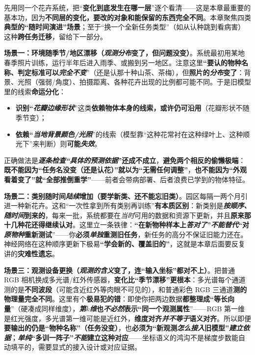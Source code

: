 先用同一个花卉系统，把“\textbf{变化到底发生在哪一层}”逐个看清——这是本章最重要的基本功，因为\textbf{不同层的变化，要改的对象和能保留的东西完全不同}。本章聚焦四类\textbf{典型的“随时间演进”场景}；至于“换一个全新任务类型”（如从认种跳到看病害）这种\textbf{跨任务迁移}，留给下一部分。

\textbf{场景一：环境随季节/地区漂移（\emph{观测分布}变了，但问题没变）}。系统最初用某地春季照片训练，运行半年后进入雨季、或搬到另一地区。注意这里\textbf{“要认的物种名称、判定标准可以\emph{完全不变}}”（还是认那十种山茶、茶梅），但\textbf{照片的\emph{分布}变了}：背景、光照（强弱/角度）、拍摄距离、各种花卉出现的比例都可能不同。于是旧模型里的线索\textbf{命运分化}：
\begin{itemize}\item \textbf{识别“\emph{花瓣边缘形状}}”这类\textbf{依赖物体本身的线索，或许仍可沿用}（花瓣形状不随季节变）；\item \textbf{依赖“\emph{当地背景颜色/光照}}”的线索（模型靠“这种花常衬在这种绿叶上、这种顺光下”来判断）则\textbf{可能\emph{失效}}。\end{itemize}
正确做法是\textbf{\emph{逐条检查“具体的预测依据}”还成不成立}，\textbf{避免两个相反的偷懒极端}：\textbf{既不能因为“任务名没变（还是认花）”就以为“无需任何调整”}，\textbf{也不能因为“外观看着变了”就“全部推倒重学”}——前者会带病部署、后者浪费已学到的物体特征。

\textbf{场景二：类别随时间\emph{陆续}增加（要学新类、还不能忘旧类）}。园区每隔一两个月引进一种新花卉。这和“一次性拿到所有类别再训练”\textbf{有本质区别}：新类别是\textbf{\emph{按顺序、随时间}到来的}，每来一批，系统都要在\emph{当时}可用的数据和资源下更新，并且\textbf{原来那十几种花还得继续认对}。这里立一条铁律：\textbf{“在新物种样本上\emph{答对了}”\emph{不能替代}“对\emph{原物种}重新测试}”——你\textbf{必须\emph{单独}重测旧任务}，新任务的高分不保证旧能力还在。神经网络在这种顺序更新下极易\textbf{“学会新的、覆盖旧的”}，这就是本章后面要反复讲的\textbf{灾难性遗忘}。

\textbf{场景三：观测设备更换（\emph{观测的含义}变了，连“输入坐标”都对不上）}。把普通 RGB 相机换成多光谱/红外传感器，\textbf{变化比“季节漂移”更根本}：多光谱每个通道测的是\textbf{不同波段}（可能含近红外等肉眼不可见的），和普通彩色 RGB 三通道\textbf{测的物理量完全不同}。这里有个\textbf{极易犯的错}：即使你把两边数据\textbf{都整理成“等长向量}”（硬凑成同样维度），\textbf{\emph{第$k$维}也\emph{不必然}表示“同一个观测属性}”——RGB 第一维是红光强度，多光谱第一维可能是近红外，\textbf{维度对齐\emph{并不等于}语义对齐}。所以即便\textbf{要输出的仍是“物种名称”（任务没变）}，也\textbf{必须为“新观测\emph{怎么接入}旧模型”\emph{建立依据}}；\textbf{\emph{单纯}“多训一阵子”\emph{不能}建立这种对应}——坐标语义的鸿沟不是梯度步数能自动填平的，需要显式的接入设计或对应证据。

